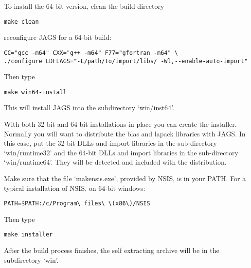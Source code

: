 \documentclass[11pt, a4paper, titlepage]{article}
\newcommand{\file}[1]{{`\normalfont\textsf{#1}'}}
\begin{document}
To install the 64-bit version, clean the build directory 
\begin{verbatim}
make clean 
\end{verbatim}
reconfigure JAGS for a 64-bit build:
\begin{verbatim}
CC="gcc -m64" CXX="g++ -m64" F77="gfortran -m64" \
./configure LDFLAGS="-L/path/to/import/libs/ -Wl,--enable-auto-import" 
\end{verbatim}
Then type
\begin{verbatim}
make win64-install
\end{verbatim}
This will install JAGS into the subdirectory \file{win/inst64}.

With both 32-bit and 64-bit installations in place you can create the
installer.  Normally you will want to distribute the blas and lapack
libraries with JAGS.  In this case, put the 32-bit DLLs and import
libraries in the sub-directory \file{win/runtime32} and the 64-bit
DLLs and import libraries in the sub-directory
\file{win/runtime64}. They will be detected and included with the
distribution.

Make sure that the file \file{makensis.exe}, provided by
NSIS, is in your PATH. For a typical installation of NSIS, on 64-bit
windows:
\begin{verbatim}
PATH=$PATH:/c/Program\ files\ \(x86\)/NSIS
\end{verbatim}
Then type
\begin{verbatim}
make installer
\end{verbatim}
After the build process finishes, the self extracting archive will be
in the subdirectory \file{win}.
\end{document}
